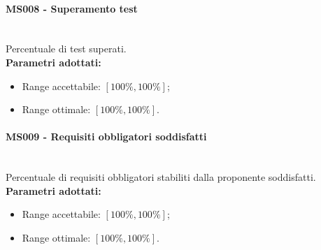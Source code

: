 \paragraph{MS008 - Superamento test}\mbox{}\\[0,3cm]
Percentuale di test superati. \\[0,2cm]
\textbf{Parametri adottati:}
\begin{itemize}
	\item Range accettabile: $[100\%,100\%]$;
	\item Range ottimale: $[100\%,100\%]$.
\end{itemize}

\paragraph{MS009 - Requisiti obbligatori soddisfatti}\mbox{}\\[0,3cm]
Percentuale di requisiti obbligatori stabiliti dalla proponente soddisfatti.\\[0,2cm]
\textbf{Parametri adottati:}
\begin{itemize}
	\item Range accettabile: $[100\%,100\%]$;
	\item Range ottimale: $[100\%,100\%]$.
\end{itemize}
	
